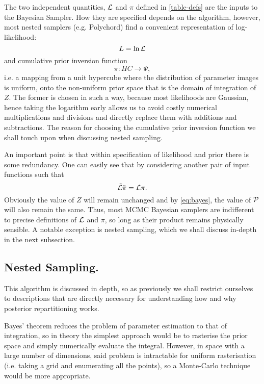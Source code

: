 \documentclass[usenatbib]{mnras}
\begin{document}
The two independent quantities, \({\cal L}\) and \(\pi\) defined in \autoref{table-defs} are the
inputs to the Bayesian Sampler. How they are specified depends on the algorithm, however, most nested samplers (e.g. Polychord) find a convenient representation of log-likelihood: 
\begin{equation}
  L = \ln \cal L
\end{equation}
and cumulative prior inversion function 
\begin{equation}
 \pi : HC \rightarrow \Psi,
\end{equation}
i.e. a mapping from a unit hypercube where the distribution of
parameter images is uniform, onto the non-uniform prior space that
is the domain of integration of \(Z\). The former is chosen in such
a way, because most likelihoods are Gaussian, hence taking the
logarithm early allows us to avoid costly numerical multiplications
and divisions and directly replace them with additions and
subtractions. The reason for choosing the cumulative prior inversion function
we shall touch upon when discussing nested sampling.

An important point is that within specification of likelihood and
prior there is some redundancy. One can easily see that by
considering another pair of input functions such that 
\begin{equation}
  \tilde{\cal L} \tilde{\pi} = \cal L \pi. 
\end{equation}
Obviously the value of \(Z\) will remain unchanged and by
\autoref{eq:bayes}, the value of \(\cal P\) will also remain the
same. Thus, most MCMC Bayesian samplers are indifferent to precise
definitions of \(\cal L\) and \(\pi\), so long as their product
remains physically sensible. A notable exception is nested
sampling, which we shall discuss in-depth in the next subsection.

\subsection{Nested Sampling.}
\label{sec:org842f468}

This algorithm is discussed in depth, so as previously we shall
restrict ourselves to descriptions that are directly necessary for
understanding how and why posterior repartitioning works.

Bayes' theorem reduces the problem of parameter estimation to that
of integration, so in theory the simplest approach would be to
rasterise the prior space and simply numerically evaluate the
integral. However, in space with a large number of dimensions, said
problem is intractable for uniform rasterisation (i.e. taking a
grid and enumerating all the points), so a Monte-Carlo technique
would be more appropriate.
\end{document}
